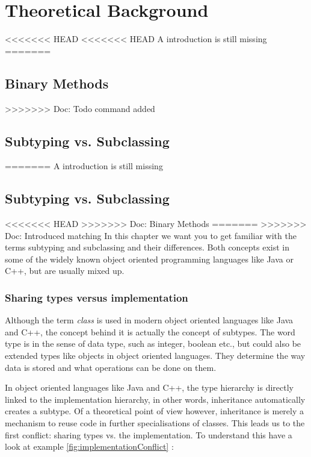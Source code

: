 
\part{Theoretical Background}
<<<<<<< HEAD
<<<<<<< HEAD
A introduction is still missing
=======
\chapter{Binary Methods}
>>>>>>> Doc: Todo command added

\chapter{Subtyping vs. Subclassing}
\label{chap:subtypingVsSubclassing}
=======
A introduction is still missing

\chapter{Subtyping vs. Subclassing}
<<<<<<< HEAD
\label{cpt:subtypingVsSubclassing}
>>>>>>> Doc: Binary Methods
=======
\label{chap:subtypingVsSubclassing}
>>>>>>> Doc: Introduced matching
In this chapter we want you to get familiar with the terms subtyping
and subclassing and their differences. Both concepts exist in some of
the widely known object oriented programming languages like Java or C++,
but are usually mixed up.

\section{Sharing types versus implementation}
\label{sec:sharingTypes}

Although the term \emph{class} is used in modern object oriented
languages like Java and C++, the concept behind it is actually the
concept of subtypes.	The word type is in the sense of data type, such
as integer, boolean etc., but could also be extended types like objects
in object oriented languages. They determine the way data is stored and
what operations can be done on them.

In object oriented languages like Java and C++, the type hierarchy
is directly linked to the implementation hierarchy, in other words,
inheritance automatically creates a subtype. Of a theoretical point
of view however, inheritance is merely a mechanism to reuse code in
further specialisations of classes. This leads us to the first conflict:
sharing types vs. the implementation. To understand this have a look at
example \ref{fig:implementationConflict} \cite{simons_theory_2003-4}:

